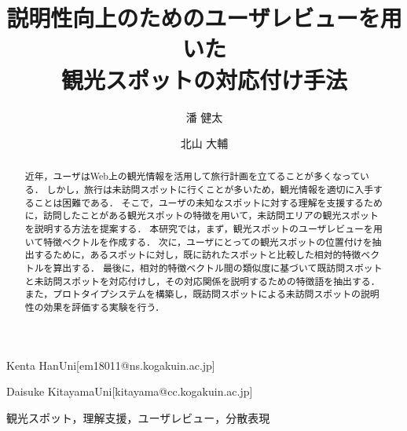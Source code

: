 \documentclass[submit]{ipsj}
\begin{document}
\title{説明性向上のためのユーザレビューを用いた\\観光スポットの対応付け手法}



\author{潘 健太}{Kenta Han}{Uni}[em18011@ns.kogakuin.ac.jp]
\author{北山 大輔}{Daisuke Kitayama}{Uni}[kitayama@cc.kogakuin.ac.jp]

\begin{abstract}
近年，ユーザはWeb上の観光情報を活用して旅行計画を立てることが多くなっている．
しかし，旅行は未訪問スポットに行くことが多いため，観光情報を適切に入手することは困難である．
そこで，ユーザの未知なスポットに対する理解を支援するために，訪問したことがある観光スポットの特徴を用いて，未訪問エリアの観光スポットを説明する方法を提案する．
本研究では，まず，観光スポットのユーザレビューを用いて特徴ベクトルを作成する．
次に，ユーザにとっての観光スポットの位置付けを抽出するために，あるスポットに対し，既に訪れたスポットと比較した相対的特徴ベクトルを算出する．
最後に，相対的特徴ベクトル間の類似度に基づいて既訪問スポットと未訪問スポットを対応付けし，その対応関係を説明するための特徴語を抽出する．
また，プロトタイプシステムを構築し，既訪問スポットによる未訪問スポットの説明性の効果を評価する実験を行う．
\end{abstract}


\begin{jkeyword}
観光スポット，理解支援，ユーザレビュー，分散表現
\end{jkeyword}
\end{document}
